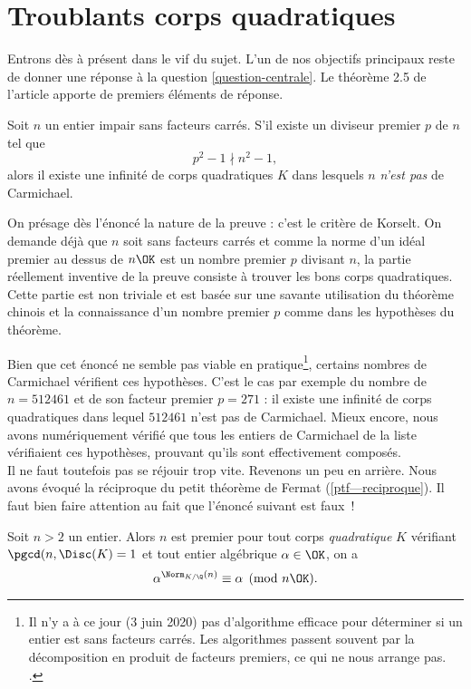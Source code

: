\section{Troublants corps quadratiques}

Entrons dès à présent dans le vif du sujet. L'un de nos objectifs principaux reste de donner une réponse à la question \ref{question-centrale}. Le théorème 2.5 de l'article apporte de premiers éléments de réponse.

\begin{theoreme}
	Soit $n$ un entier impair sans facteurs carrés. S'il existe un diviseur premier $p$ de $n$ tel que $$p^2 - 1 \nmid n^2 - 1,$$ alors il existe une infinité de corps quadratiques $K$ dans lesquels $n$ \emph{n'est pas} de Carmichael.
\end{theoreme}

\begin{remarque}
	On présage dès l'énoncé la nature de la preuve : c'est le critère de Korselt. On demande déjà que $n$ soit sans facteurs carrés et comme la norme d'un idéal premier au dessus de $n\OK$ est un nombre premier $p$ divisant $n$, la partie réellement inventive de la preuve consiste à trouver les bons corps quadratiques. Cette partie est non triviale et est basée sur une savante utilisation du théorème chinois et la connaissance d'un nombre premier $p$ comme dans les hypothèses du théorème.
\end{remarque}

Bien que cet énoncé ne semble pas viable en pratique\footnote{Il n'y a à ce jour (3 juin 2020) pas d'algorithme efficace pour déterminer si un entier est sans facteurs carrés. Les algorithmes passent souvent par la décomposition en produit de facteurs premiers, ce qui ne nous arrange pas. .}, certains nombres de Carmichael vérifient ces hypothèses. C'est le cas par exemple du nombre de $n=512461$ et de son facteur premier $p=271$ : il existe une infinité de corps quadratiques dans lequel $512461$ n'est pas de Carmichael. Mieux encore, nous avons numériquement vérifié que tous les entiers de Carmichael de la liste  vérifiaient ces hypothèses, prouvant qu'ils sont effectivement composés. \\

Il ne faut toutefois pas se réjouir trop vite. Revenons un peu en arrière. Nous avons évoqué la réciproque du petit théorème de Fermat (\ref{ptf—reciproque}). Il faut bien faire attention au fait que l'énoncé suivant est faux~!

\begin{enoncefaux}
	Soit $n>2$ un entier. Alors $n$ est premier \ssi pour tout corps \emph{quadratique} $K$ vérifiant $\pgcd(n, \Disc(K) = 1$ et tout entier algébrique $\alpha \in \OK$, on a $$\alpha^{\Norm_{K/\Q}(n)} \equiv \alpha \pmod{n\OK}.$$
\end{enoncefaux}
